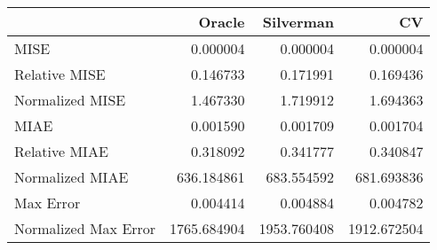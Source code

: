 \begin{tabular}{lrrr}
  \hline
 & Oracle & Silverman & CV \\ 
  \hline
MISE & 0.000004 & 0.000004 & 0.000004 \\ 
  Relative MISE & 0.146733 & 0.171991 & 0.169436 \\ 
  Normalized MISE & 1.467330 & 1.719912 & 1.694363 \\ 
  MIAE & 0.001590 & 0.001709 & 0.001704 \\ 
  Relative MIAE & 0.318092 & 0.341777 & 0.340847 \\ 
  Normalized MIAE & 636.184861 & 683.554592 & 681.693836 \\ 
  Max Error & 0.004414 & 0.004884 & 0.004782 \\ 
  Normalized Max Error & 1765.684904 & 1953.760408 & 1912.672504 \\ 
   \hline
\end{tabular}
